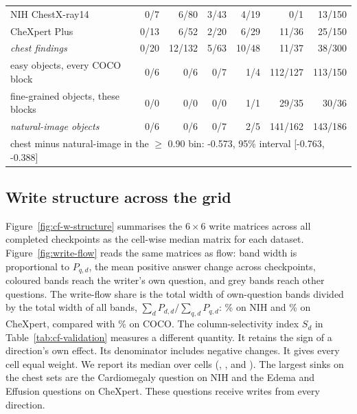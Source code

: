 \documentclass{article}
\makeatletter
\providecommand{\DIFaddtex}[1]{{\protect\color{blue}\uwave{#1}}} %
\providecommand{\DIFdeltex}[1]{{\protect\color{red}\sout{#1}}} %
\providecommand{\DIFaddbegin}{} %
\providecommand{\DIFaddend}{} %
\providecommand{\DIFdelbegin}{} %
\providecommand{\DIFdelend}{} %
\providecommand{\DIFaddendFL}{} %
\providecommand{\DIFadd}[1]{\texorpdfstring{\DIFaddtex{#1}}{#1}} %
\providecommand{\DIFdel}[1]{\texorpdfstring{\DIFdeltex{#1}}{}} %
\providecommand{\DIFscaledelfig}{0.5}
\newlength{\DIFdelgraphicswidth} %
\newlength{\DIFdelgraphicsheight} %
\providecommand{\DIFaddincludegraphics}[2][]{{\color{blue}\fbox{\DIFOincludegraphics[#1]{#2}}}} %
\providecommand{\DIFdelincludegraphics}[2][]{%
\sbox{\DIFdelgraphicsbox}{\DIFOincludegraphics[#1]{#2}}%
\settoboxwidth{\DIFdelgraphicswidth}{\DIFdelgraphicsbox} %
\settoboxtotalheight{\DIFdelgraphicsheight}{\DIFdelgraphicsbox} %
\scalebox{\DIFscaledelfig}{%
\parbox[b]{\DIFdelgraphicswidth}{\usebox{\DIFdelgraphicsbox}\\[-\baselineskip] \rule{\DIFdelgraphicswidth}{0em}}\llap{\resizebox{\DIFdelgraphicswidth}{\DIFdelgraphicsheight}{%
\setlength{\unitlength}{\DIFdelgraphicswidth}%
\begin{picture}(1,1)%
\thicklines\linethickness{2pt} %
{\color[rgb]{1,0,0}\put(0,0){\framebox(1,1){}}}%
{\color[rgb]{1,0,0}\put(0,0){\line( 1,1){1}}}%
{\color[rgb]{1,0,0}\put(0,1){\line(1,-1){1}}}%
\end{picture}%
}\hspace*{3pt}}} %
} %
\DeclareRobustCommand{\DIFaddbegin}{\DIFOaddbegin \let\includegraphics\DIFaddincludegraphics} %
\DeclareRobustCommand{\DIFaddend}{\DIFOaddend \let\includegraphics\DIFOincludegraphics} %
\DeclareRobustCommand{\DIFdelbegin}{\DIFOdelbegin \let\includegraphics\DIFdelincludegraphics} %
\DeclareRobustCommand{\DIFdelend}{\DIFOaddend \let\includegraphics\DIFOincludegraphics} %
\DeclareRobustCommand{\DIFaddendFL}{\DIFOaddendFL \let\includegraphics\DIFOincludegraphics} %
\let\sout@orig\sout %
\renewcommand{\sout}[1]{\ifmmode\text{\sout@orig{\ensuremath{#1}}}\else\sout@orig{#1}\fi} %
\makeatother
\begin{document}
\begin{table}[htbp]
{\begin{tabular}{lrrrrrr}
\midrule
NIH ChestX-ray14 & 0/7 & 6/80 & 3/43 & 4/19 & 0/1 & 13/150 \\
CheXpert Plus & 0/13 & 6/52 & 2/20 & 6/29 & 11/36 & 25/150 \\
\textit{chest findings} & 0/20 & 12/132 & 5/63 & 10/48 & 11/37 & 38/300 \\
easy objects, every COCO block & 0/6 & 0/6 & 0/7 & 1/4 & 112/127 & 113/150 \\
fine-grained objects, these blocks & 0/0 & 0/0 & 0/0 & 1/1 & 29/35 & 30/36 \\
\textit{natural-image objects} & 0/6 & 0/6 & 0/7 & 2/5 & 141/162 & 143/186 \\
\multicolumn{7}{l}{\quad chest minus natural-image in the $\geq$ 0.90 bin: -0.573, 95\% interval [-0.763, -0.388]} \\
\bottomrule
\end{tabular}}
\DIFaddendFL \end{table}

\subsection{Write structure across the grid}
\label{app:cf-figures}

Figure~\ref{fig:cf-w-structure} summarises the $6\times6$ write matrices across all completed checkpoints as the cell-wise median matrix for each dataset. Figure~\ref{fig:write-flow} reads the same matrices as flow: band width is proportional to \DIFdelbegin \DIFdel{$P_{q,d}$}\DIFdelend \DIFaddbegin \DIFadd{$F_{q,d}$}\DIFaddend , the mean positive answer change across checkpoints, coloured bands reach the writer's own question, and grey bands reach other questions. The write-flow share is the total width of own-question bands divided by the total width of all bands, \DIFdelbegin \DIFdel{$\sum_d P_{d,d}/\sum_{q,d}P_{q,d}$}\DIFdelend \DIFaddbegin \DIFadd{$\sum_d F_{d,d}/\sum_{q,d}F_{q,d}$}\DIFaddend : \cfOwnShareNih\% on NIH and \cfOwnShareChex\% on CheXpert, compared with \cfOwnShareCoco\% on COCO. The column-selectivity index \DIFdelbegin \DIFdel{$S_d$ }\DIFdelend \DIFaddbegin \DIFadd{$\kappa_d$ }\DIFaddend in Table~\ref{tab:cf-validation} measures a different quantity. It retains the sign of a direction's own effect. Its denominator includes negative changes. It gives every cell equal weight. We report its median over cells (\cfValColSelNih{}, \cfValColSelChex{}, and \cfValColSelCoco{}). The largest sinks on the chest sets are the Cardiomegaly question on NIH and the Edema and Effusion questions on CheXpert. These questions receive writes from every direction.
\end{document}
